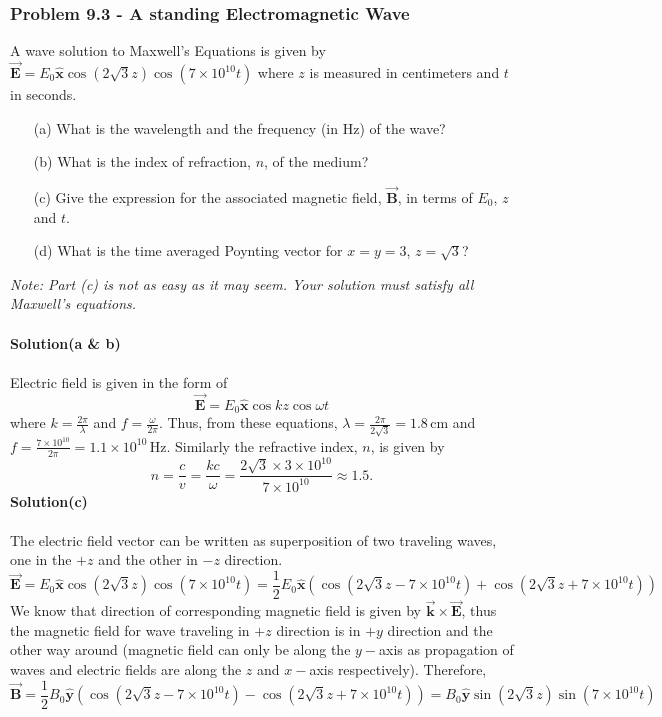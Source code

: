 \documentclass{article}
\begin{document}
\subsubsection*{Problem 9.3 - A standing Electromagnetic Wave}
A wave solution to Maxwell's Equations is given by $\boldsymbol{\vec{E}}=E_0\boldsymbol{\hat{x}}\cos(2\sqrt{3}z)\cos(7\times10^{10}t)$ where $z$ is measured in centimeters and $t$ in seconds.
\begin{enumerate}
    \item[(a)]What is the wavelength and the frequency (in Hz) of the wave?
    \item[(b)]What is the index of refraction, $n$, of the medium?
    \item[(c)]Give the expression for the associated magnetic field, $\boldsymbol{\vec{B}}$, in terms of $E_0$, $z$ and $t$.
    \item[(d)]What is the time averaged Poynting vector for $x=y=3$, $z=\sqrt{3}$?
\end{enumerate}
\textit{Note: Part (c) is not as easy as it may seem. Your solution must satisfy all Maxwell's equations.}
\\
\\\textbf{Solution(a \& b)}
\\
\\Electric field is given in the form of
\[\boldsymbol{\vec{E}}=E_0\boldsymbol{\hat{x}}\cos kz\cos\omega t\]
where $k=\frac{2\pi}{\lambda}$ and $f=\frac{\omega}{2\pi}$. Thus, from these equations, $\lambda=\frac{2\pi}{2\sqrt{3}}=1.8\,$cm and $f=\frac{7\times10^{10}}{2\pi}=1.1\times10^{10}\,$Hz. Similarly the refractive index, $n$, is given by
\[n=\frac{c}{v}=\frac{kc}{\omega}=\frac{2\sqrt{3}\times3\times10^{10}}{7\times10^{10}}\approx1.5.\]
\textbf{Solution(c)}
\\
\\The electric field vector can be written as superposition of two traveling waves, one in the $+z$ and the other in $-z$ direction.
\[\boldsymbol{\vec{E}}=E_0\boldsymbol{\hat{x}}\cos(2\sqrt{3}z)\cos(7\times10^{10}t)=\frac{1}{2}E_0\boldsymbol{\hat{x}}\left(\cos(2\sqrt{3}z-7\times10^{10}t)+\cos(2\sqrt{3}z+7\times10^{10}t)\right)\]
We know that direction of corresponding magnetic field is given by $\boldsymbol{\vec{k}}\times\boldsymbol{\vec{E}}$, thus the magnetic field for wave traveling in $+z$ direction is in $+y$ direction and the other way around (magnetic field can only be along the $y-$axis as propagation of waves and electric fields are along the $z$ and $x-$axis respectively). Therefore,
\[\boldsymbol{\vec{B}}=\frac{1}{2}B_0\boldsymbol{\hat{y}}\left(\cos(2\sqrt{3}z-7\times10^{10}t)-\cos(2\sqrt{3}z+7\times10^{10}t)\right)=B_0\boldsymbol{\hat{y}}\sin(2\sqrt{3}z)\sin(7\times10^{10}t)\]
\end{document}
